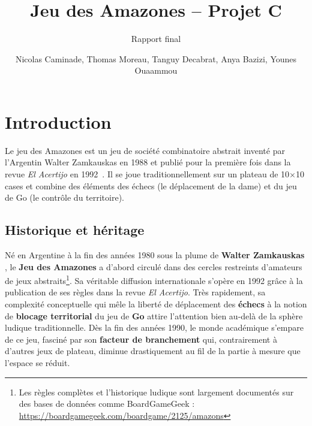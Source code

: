 \documentclass[a4paper]{article}
\title{Jeu des Amazones -- Projet C}
\subtitle{Rapport final}
\author{Nicolas Caminade, Thomas Moreau, Tanguy Decabrat, Anya Bazizi, Younes Ouaammou}
\begin{document}

\maketitle
\thispagestyle{empty}




\section{Introduction}

Le jeu des Amazones est un jeu de société combinatoire abstrait inventé
par l'Argentin Walter Zamkauskas en 1988 et publié pour la première fois
dans la revue \textit{El Acertijo} en 1992~\cite{zamkauskas1992}. Il se joue
traditionnellement sur un plateau de 10$\times$10 cases et combine des
éléments des échecs (le déplacement de la dame) et du jeu de Go (le contrôle
du territoire).
\subsection{Historique et héritage}

Né en Argentine à la fin des années 1980 sous la plume de \textbf{Walter Zamkauskas} \cite{zamkauskas1992}, le \textbf{Jeu des Amazones} a d'abord circulé dans des cercles restreints d'amateurs de jeux abstraits\footnote{Les règles complètes et l'historique ludique sont largement documentés sur des bases de données comme BoardGameGeek : \url{https://boardgamegeek.com/boardgame/2125/amazons}}. Sa véritable diffusion internationale s'opère en 1992 grâce à la publication de ses règles dans la revue \textit{El Acertijo}. Très rapidement, sa complexité conceptuelle qui mêle la liberté de déplacement des \textbf{échecs} à la notion de \textbf{blocage territorial} du jeu de \textbf{Go} attire l'attention bien au-delà de la sphère ludique traditionnelle. Dès la fin des années 1990, le monde académique s'empare de ce jeu, fasciné par son \textbf{facteur de branchement} qui, contrairement à d'autres jeux de plateau, diminue drastiquement au fil de la partie à mesure que l'espace se réduit.
\end{document}
